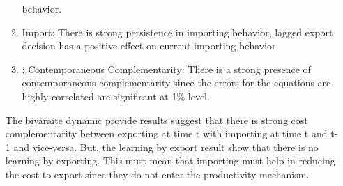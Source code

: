 \documentclass[11pt]{article}
\begin{document}
\begin{itemize}
\begin{enumerate}
  behavior. 
\item Import: There is strong persistence in importing behavior,
  lagged export decision has a positive effect on current importing
  behavior. 
\item: Contemporaneous Complementarity: There is a strong presence of
  contemporaneous complementarity since the errors for the equations are
  highly correlated are significant at 1\% level.  
\end{enumerate}
The bivaraite dynamic provide  results suggest that there is strong cost complementarity
between exporting at time t with importing at time t and t-1 and
vice-versa. But, the learning by export result show that there is no
learning by exporting. This must mean that importing must help in
reducing the cost to export since they do not enter the productivity
mechanism. 

\end{itemize}







\end{document}

